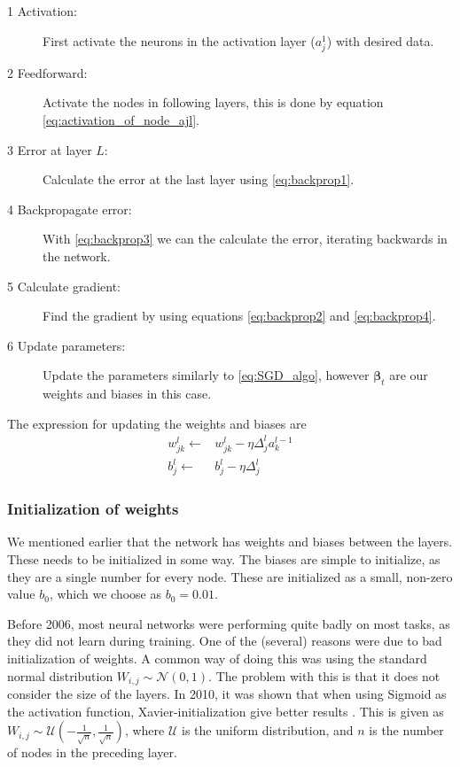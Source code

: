 \documentclass[12pt]{extarticle}
\begin{document}
\begin{description}
	\item[1 Activation:] First activate the neurons in the activation layer ($a^1_j$) with desired data.
	\item[2 Feedforward:] Activate the nodes in following layers, this is done by equation \eqref{eq:activation_of_node_ajl}.
	\item[3 Error at layer $L$:] Calculate the error at the last layer using \eqref{eq:backprop1}.
	\item[4 Backpropagate error:] With \eqref{eq:backprop3} we can the calculate the error, iterating backwards in the network.
	\item[5 Calculate gradient:] Find the gradient by using equations \eqref{eq:backprop2} and \eqref{eq:backprop4}.
	\item[6 Update parameters:] Update the parameters similarly to \eqref{eq:SGD_algo}, however $\boldsymbol{\beta}_t$ are our weights and biases in this case.
\end{description}

The expression for updating the weights and biases are
\begin{align}
	w_{jk}^l \leftarrow & w_{jk}^l - \eta \Delta_j^l a_k^{l-1} \label{eq:update_weights} \\
	b_j^l \leftarrow    & b_j^l - \eta \Delta_j^l \label{eq:update_biases}
\end{align}

\subsubsection{Initialization of weights} \label{sec:wi}
We mentioned earlier that the network has weights and biases between the layers. These needs to be initialized in some way. The biases are simple to initialize, as they are a single number for every node. These are initialized as a small, non-zero value $b_0$, which we choose as $b_0=0.01$.

Before 2006, most neural networks were performing quite badly on most tasks, as they did not learn during training. One of the (several) reasons were due to bad initialization of weights. A common way of doing this was using the standard normal distribution $W_{i,j} \sim  \mathcal{N}(0, 1)$. The problem with this is that it does not consider the size of the layers. In 2010, it was shown that when using Sigmoid as the activation function, Xavier-initialization give better results \cite{xavier}. This is given as $W_{i, j}\sim\mathcal{U} \left(-\frac{1}{\sqrt{n}}, \frac{1}{\sqrt{n}} \right)$, where $\mathcal{U}$ is the uniform distribution, and $n$ is the number of nodes in the preceding layer.
\end{document}
